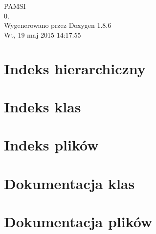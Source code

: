 \documentclass[twoside]{book}
\newcommand{\clearemptydoublepage}{%
  \newpage{\pagestyle{empty}\cleardoublepage}%
}
\begin{document}
\hypersetup{pageanchor=false}
\begin{titlepage}
\vspace*{7cm}
\begin{center}%
{\Large P\-A\-M\-S\-I \\[1ex]\large 0. }\\
\vspace*{1cm}
{\large Wygenerowano przez Doxygen 1.8.6}\\
\vspace*{0.5cm}
{\small Wt, 19 maj 2015 14:17:55}\\
\end{center}
\end{titlepage}
\clearemptydoublepage
\tableofcontents
\clearemptydoublepage
{}
\hypersetup{pageanchor=true}

\chapter{Indeks hierarchiczny}

\chapter{Indeks klas}

\chapter{Indeks plików}

\chapter{Dokumentacja klas}














\chapter{Dokumentacja plików}



































\newpage
{}
{}
\printindex
\end{document}
